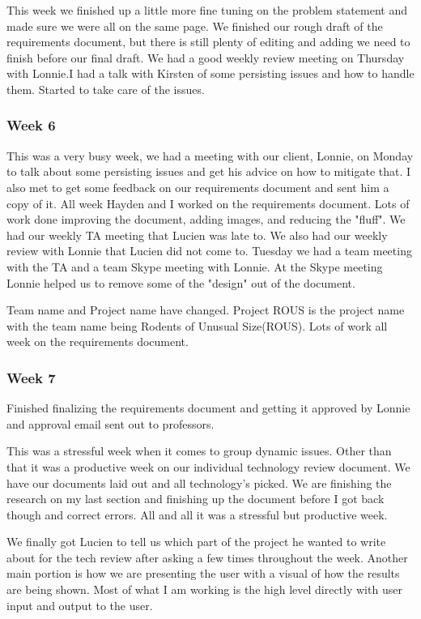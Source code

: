 \documentclass[draftclsnofoot, onecolumn, compsoc, 10pt]{IEEEtran}
\begin{document}
This week we finished up  a little more fine tuning on the problem statement and made sure we were all on the same page.  We finished our rough draft of the requirements document, but there is still plenty of editing and adding we need to finish before our final draft. We had a good weekly review meeting on Thursday with Lonnie.I had a talk with Kirsten of some persisting issues and how to handle them. Started to take care of the issues.

\subsubsection{Week 6}
This was a very busy week, we had a meeting with our client, Lonnie, on Monday to talk about some persisting issues and get his advice on how to mitigate that. I also met to get some feedback on our requirements document and sent him a copy of it. All week Hayden and I worked on the requirements document. Lots of work done improving the document, adding images, and reducing the "fluff". We had our weekly TA meeting that Lucien was late to. We also had our weekly review with Lonnie that Lucien did not come to. Tuesday we had a team meeting with the TA and a team Skype meeting with Lonnie. At the Skype meeting Lonnie helped us to remove some of the "design" out of the document. 

Team name and Project name have changed. Project ROUS is the project name with the team name being Rodents of Unusual Size(ROUS). Lots of work all week on the requirements document.

\subsubsection{Week 7}
Finished finalizing the requirements document and getting it approved by Lonnie and approval email sent out to professors.

This was a stressful week when it comes to group dynamic issues. Other than that it was a productive week on our individual technology review document. We have our documents laid out and all technology's picked. We are finishing the research on my last section and finishing up the document before I got back though and correct errors. All and all it was a stressful but productive week.

We finally got Lucien to tell us which part of the project he wanted to write about for the tech review after asking a few times throughout the week. Another main portion is how we are presenting the user with a visual of how the results are being shown. Most of what I am working is the high level directly with user input and output to the user. 
\end{document}
